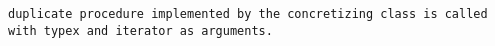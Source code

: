 
\tt{duplicate} procedure implemented by the concretizing class
is called with \tt{typex} and \tt{iterator} as arguments.
